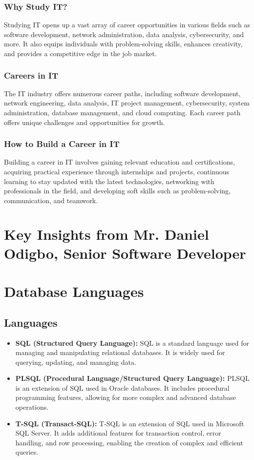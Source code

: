 \documentclass[a4paper,12pt]{report}
\begin{document}
	\subsubsection{Why Study IT?}
	Studying IT opens up a vast array of career opportunities in various fields such as software development, network administration, data analysis, cybersecurity, and more. It also equips individuals with problem-solving skills, enhances creativity, and provides a competitive edge in the job market.
	
	\subsubsection{Careers in IT}
	The IT industry offers numerous career paths, including software development, network engineering, data analysis, IT project management, cybersecurity, system administration, database management, and cloud computing. Each career path offers unique challenges and opportunities for growth.
	
	\subsubsection{How to Build a Career in IT}
	Building a career in IT involves gaining relevant education and certifications, acquiring practical experience through internships and projects, continuous learning to stay updated with the latest technologies, networking with professionals in the field, and developing soft skills such as problem-solving, communication, and teamwork.
	
	\section{Key Insights from Mr. Daniel Odigbo, Senior Software Developer}
	
	\section{Database Languages}
	
	\subsection{Languages}
	\begin{itemize}
		\item \textbf{SQL (Structured Query Language):} SQL is a standard language used for managing and manipulating relational databases. It is widely used for querying, updating, and managing data.
		\item \textbf{PLSQL (Procedural Language/Structured Query Language):} PLSQL is an extension of SQL used in Oracle databases. It includes procedural programming features, allowing for more complex and advanced database operations.
		\item \textbf{T-SQL (Transact-SQL):} T-SQL is an extension of SQL used in Microsoft SQL Server. It adds additional features for transaction control, error handling, and row processing, enabling the creation of complex and efficient queries.
	\end{itemize}
	
\end{document}
